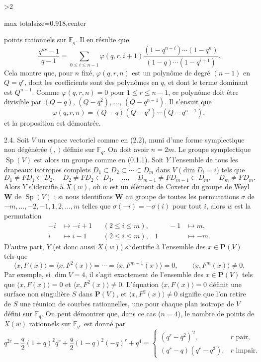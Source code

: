 \documentclass[9pt,twoside]{extarticle}
\newcommand{\EditionPage}[3]{%
  \ifnum#1>2\clearpage\fi
  \pdfbookmark[1]{Printed page #2}{fr-folio-#2}%
  \hypertarget{fr-physical-#1}{}%
  \noindent\begin{adjustbox}{max totalsize={\textwidth}{0.918\textheight},center}
  \begin{minipage}[t]{\textwidth}
  \fontsize{9.4}{11.1}\selectfont\justifying
  #3
  \end{minipage}
  \end{adjustbox}%
}
\begin{document}
\EditionPage{17}{118}{%
points rationnels sur \(\mathbb F_q\). Il en résulte que \[
\frac{q^{nr}-1}{q-1}
=
\sum_{0\le i\le n-1}
\varphi(q,r,i+1)
\frac{(1-q^{n-i})\cdots(1-q^n)}{(1-q)\cdots(1-q^{i+1})}.
\] Cela montre que, pour \(n\) fixé, \(\varphi(q,r,n)\) est un polynôme de degré \((n-1)\) en \(Q=q^r\), dont les coefficients sont des polynômes en \(q\), et dont le terme dominant est \(Q^{n-1}\). Comme \(\varphi(q,r,n)=0\) pour \(1\le r\le n-1\), ce polynôme doit être divisible par \((Q-q)\), \((Q-q^2)\), \(\ldots\), \((Q-q^{n-1})\). Il s'ensuit que \[
\varphi(q,r,n)=(Q-q)(Q-q^2)\cdots(Q-q^{n-1}),
\] et la proposition est démontrée.\par

2.4. Soit \(V\) un espace vectoriel comme en (2.2), muni d'une forme symplectique non dégénérée \(\langle\ ,\ \rangle\) définie sur \(\mathbb F_q\). On doit avoir \(n=2m\). Le groupe symplectique \(\operatorname{Sp}(V)\) est alors un groupe comme en (0.1.1). Soit \(Y\) l'ensemble de tous les drapeaux isotropes complets \(D_1\subset D_2\subset\cdots\subset D_m\) dans \(V\) (\(\dim D_i=i\)) tels que \[
D_1\ne FD_1\subset D_2,\quad
D_2\ne FD_2\subset D_3,\quad\ldots,\quad
D_{m-1}\ne FD_{m-1}\subset D_m,\quad
D_m\ne FD_m.
\] Alors \(Y\) s'identifie à \(X(w)\), où \(w\) est un élément de Coxeter du groupe de Weyl \(\mathbf W\) de \(\operatorname{Sp}(V)\) ; si nous identifions \(\mathbf W\) au groupe de toutes les permutations \(\sigma\) de \(-m,\ldots,-2,-1,1,2,\ldots,m\) telles que \(\sigma(-i)=-\sigma(i)\) pour tout \(i\), alors \(w\) est la permutation \[
\begin{aligned}
-i&\longmapsto -i+1 &&(2\le i\le m),&\qquad -1&\longmapsto m,\\
i&\longmapsto i-1 &&(2\le i\le m),& 1&\longmapsto -m.
\end{aligned}
\] D'autre part, \(Y\) (et donc aussi \(X(w)\)) s'identifie à l'ensemble des \(x\in\mathbf P(V)\) tels que \[
\langle x,F(x)\rangle=\langle x,F^2(x)\rangle=\cdots=\langle x,F^{m-1}(x)\rangle=0,
\qquad
\langle x,F^m(x)\rangle\ne0.
\] Par exemple, si \(\dim V=4\), il s'agit exactement de l'ensemble des \(x\in\mathbf P(V)\) tels que \(\langle x,F(x)\rangle=0\) et \(\langle x,F^2(x)\rangle\ne0\). L'équation \(\langle x,F(x)\rangle=0\) définit une surface non singulière \(S\) dans \(\mathbf P(V)\), et \(\langle x,F^2(x)\rangle\ne0\) signifie que l'on retire de \(S\) une réunion de courbes rationnelles, une pour chaque plan isotrope de \(V\) défini sur \(\mathbb F_q\). On peut démontrer que, dans ce cas (\(n=4\)), le nombre de points de \(X(w)\) rationnels sur \(\mathbb F_{q^r}\) est donné par \[
q^{2r}-\frac q2(1+q)^2q^r+\frac q2(1-q)^2(-q)^r+q^4
=
\begin{cases}
(q^r-q^2)^2,&r\text{ pair},\\
(q^r-q)(q^r-q^3),&r\text{ impair}.
\end{cases}
\]\par

}
\end{document}
